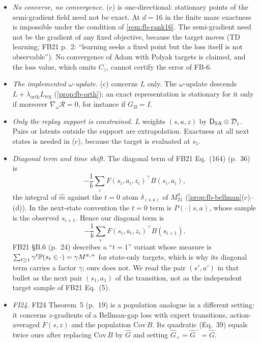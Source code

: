 \begin{remark}\label{rem:fb-loss}
\leavevmode
\begin{itemize}[nosep]
\item \emph{No converse, no convergence.} (c) is one-directional: stationary points of the semi-gradient field need not be exact. At $d=16$ in the finite maze exactness is impossible under the condition of \cref{rem:fb-rank16}.
  The semi-gradient need not be the gradient of any fixed objective, because the target moves (TD learning; FB21 p.~2: ``learning seeks a fixed point but the loss itself is not observable'').
  No convergence of Adam with Polyak targets is claimed, and the loss value, which omits $C_z$, cannot certify the error of FB-6.
\item \emph{The implemented $\omega$-update.} (c) concerns $L$ only. The $\omega$-update descends $L+\lambda_{\mathrm{orth}}L_{\mathrm{reg}}$ (\cref{prop:fb-orth}); an exact representation is stationary for it only if moreover $\nabla_\omega\mathcal R=0$, for instance if $G_B=I$.
\item \emph{Only the replay support is constrained.} $L$ weights $(s,a,z)$ by $\mathsf D_{\mathrm{SA}}\otimes\mathcal D_z$. Pairs or latents outside the support are extrapolation. Exactness at all next states is needed in (c), because the target is evaluated at $s_1$.
\item \emph{Diagonal term and time shift.} The diagonal term of FB21 Eq.~(164) (p.~36) is
  \[-\frac1b\sum_iF(s_i,a_i,z_i)^\top B(s_i,a_i),\]
  the integral of $\hat m$ against the $t=0$ atom $\delta_{(s,a)}$ of $M^\pi_{21}$ (\cref{prop:fb-bellman}(c)--(d)).
  In the next-state convention the $t=0$ term is $P(\cdot\mid s,a)$, whose sample is the observed $s_{i+1}$. Hence our diagonal term is
  \[-\frac1b\sum_iF(s_i,a_i,z_i)^\top B(s_{i+1}).\]
  FB21 \S B.6 (p.~24) describes a ``$t=1$'' variant whose measure is $\sum_{t\ge1}\gamma^t\mathbb{P}(s_t\in\cdot)=\gamma M^{\pi,+}$ for state-only targets, which is why its diagonal term carries a factor $\gamma$; ours does not.
  We read the pair $(s',a')$ in that bullet as the next pair $(s_1,a_1)$ of the transition, not as the independent target sample of FB21 Eq.~(5).
\item \emph{FI24.} FI24 Theorem~5 (p.~19) is a population analogue in a different setting: it concerns $z$-gradients of a Bellman-gap loss with expert transitions, action-averaged $F(s,z)$ and the population $\mathrm{Cov}\,B$. Its quadratic (Eq.~39) equals twice ours after replacing $\mathrm{Cov}\,B$ by $\hat G$ and setting $\hat G_\times=\hat G^-=\hat G$.
\end{itemize}
\end{remark}

